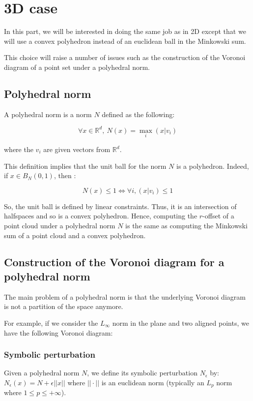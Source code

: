 \chapter{3D case}

In this part, we will be interested in doing the same job as in 2D except that
we will use a convex polyhedron instead of an euclidean ball in the Minkowski
sum.

This choice will raise a number of issues such as the construction of the
Voronoi diagram of a point set under a polyhedral norm.

\section{Polyhedral norm}
A polyhedral norm is a norm $ N $ defined as the following:

$$ \forall x \in \mathbb{R}^d,~ N(x) = \max_{i} (x | v_i) $$

where the $ v_i $ are given vectors from $ \mathbb{R}^d $.

This definition implies that the unit ball for the norm $ N $ is a polyhedron.
Indeed, if $ x \in B_N(0, 1) $, then :

$$ N(x) \leq 1 \Longleftrightarrow \forall i, (x | v_i) \leq 1 $$

So, the unit ball is defined by linear constraints. Thus, it is an intersection
of halfspaces and so is a convex polyhedron. Hence, computing the $ r $-offset
of a point cloud under a polyhedral norm $ N $ is the same as computing the
Minkowski sum of a point cloud and a convex polyhedron.

\section{Construction of the Voronoi diagram for a polyhedral norm}

The main problem of a polyhedral norm is that the underlying Voronoi diagram is
not a partition of the space anymore.

For example, if we consider the $ L_\infty $ norm in the plane and two aligned
points, we have the following Voronoi diagram:


\subsection{Symbolic perturbation}

Given a polyhedral norm $ N $, we define its symbolic perturbation $ N_\epsilon
$ by: $ N_\epsilon (x) = N + \epsilon || x || $ where $ || \cdot || $ is an
euclidean norm (typically an $ L_p $ norm where $ 1 \leq p \leq +\infty $).


